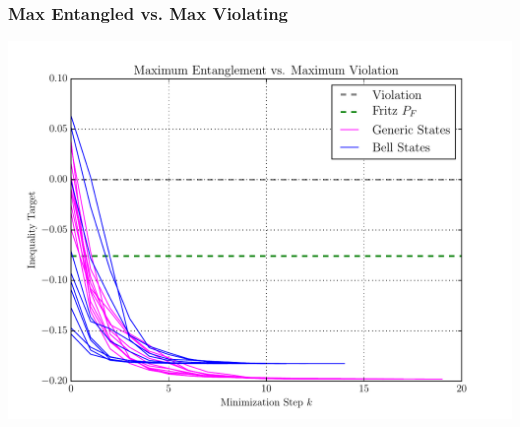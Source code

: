 \documentclass[
    hyperref={bookmarks=false},%
    xcolor={dvipsnames},
]{beamer}
\begin{document}
\begin{frame}
    \frametitle{Max Entangled vs. Max Violating} %
    \includegraphics[width=\linewidth]{../../figures/optimizations/Max_Entanglement_vs_Max_Violation_fritz_seed.pdf}
\end{frame}
\end{document}
